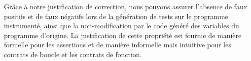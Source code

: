 Grâce à notre justification de correction, nous pouvons assurer l'absence de
faux positifs et de faux négatifs lors de la génération de tests sur le
programme instrumenté, ainsi que la non-modification par le code généré des
variables du programme d'origine.
La justification de cette propriété est fournie de manière formelle pour les
assertions et de manière informelle mais intuitive pour les contrats de boucle
et les contrats de fonction.








